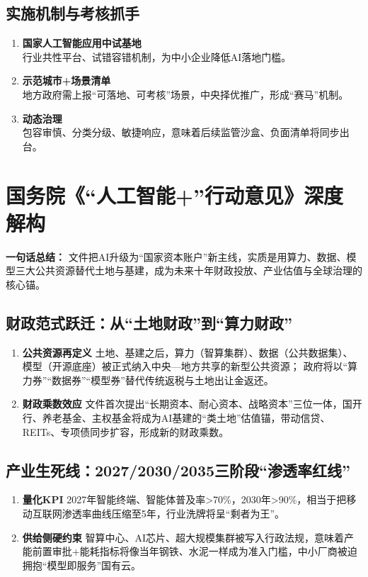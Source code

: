 \subsection{实施机制与考核抓手}
\begin{enumerate}[leftmargin=*, nosep]
    \item \textbf{国家人工智能应用中试基地}  \\
    行业共性平台、试错容错机制，为中小企业降低AI落地门槛。
    \item \textbf{示范城市+场景清单}  \\
    地方政府需上报“可落地、可考核”场景，中央择优推广，形成“赛马”机制。
    \item \textbf{动态治理}  \\
    包容审慎、分类分级、敏捷响应，意味着后续监管沙盒、负面清单将同步出台。
\end{enumerate}

\clearpage

\section{国务院《“人工智能+”行动意见》深度解构}

\textbf{一句话总结：}  
文件把AI升级为“国家资本账户”新主线，实质是用算力、数据、模型三大公共资源替代土地与基建，成为未来十年财政投放、产业估值与全球治理的核心锚。

\subsection{财政范式跃迁：从“土地财政”到“算力财政”}
\begin{enumerate}[leftmargin=*, nosep]
    \item \textbf{公共资源再定义}  
    土地、基建之后，算力（智算集群）、数据（公共数据集）、模型（开源底座）被正式纳入中央—地方共享的新型公共资源；  
    政府将以“算力券”“数据券”“模型券”替代传统返税与土地出让金返还。
    \item \textbf{财政乘数效应}  
    文件首次提出“长期资本、耐心资本、战略资本”三位一体，国开行、养老基金、主权基金将成为AI基建的“类土地”估值锚，带动信贷、REITs、专项债同步扩容，形成新的财政乘数。
\end{enumerate}

\subsection{产业生死线：2027/2030/2035三阶段“渗透率红线”}
\begin{enumerate}[leftmargin=*, nosep]
    \item \textbf{量化KPI}  
    2027年智能终端、智能体普及率>70\%，2030年>90\%，相当于把移动互联网渗透率曲线压缩至5年，行业洗牌将呈“剩者为王”。
    \item \textbf{供给侧硬约束}  
    智算中心、AI芯片、超大规模集群被写入行政法规，意味着产能前置审批+能耗指标将像当年钢铁、水泥一样成为准入门槛，中小厂商被迫拥抱“模型即服务”国有云。
\end{enumerate}

